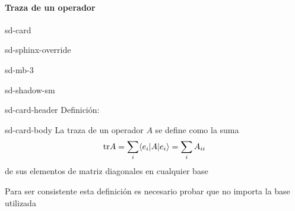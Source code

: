 \documentclass[letterpaper,10pt,english]{jupyterBook}
\newcommand{\bra}[1]{\langle #1|}
\newcommand{\ket}[1]{|#1\rangle}
\newcommand{\tr}{{\rm tr}}
\begin{document}
\paragraph{Traza de un operador}
\label{\detokenize{docs/Part_01_Formalismo/Chapter_01_02_Formalismo_matem_xe1tico/01_03_Operadores_myst:traza-de-un-operador}}
\begin{sphinxuseclass}{sd-card}
\begin{sphinxuseclass}{sd-sphinx-override}
\begin{sphinxuseclass}{sd-mb-3}
\begin{sphinxuseclass}{sd-shadow-sm}
\begin{sphinxuseclass}{sd-card-header}
\sphinxAtStartPar
Definición:

\end{sphinxuseclass}
\begin{sphinxuseclass}{sd-card-body}
\sphinxAtStartPar
La traza de un operador \(A\) se define como la suma
\begin{equation*}
\tr A = \sum_ i \bra{e_i} A\ket{e_i} =  \sum_{i} A_{ii} 
\end{equation*}
\sphinxAtStartPar
de sus elementos de matriz diagonales  en cualquier base 

\end{sphinxuseclass}
\end{sphinxuseclass}
\end{sphinxuseclass}
\end{sphinxuseclass}
\end{sphinxuseclass}
\sphinxAtStartPar
Para ser consistente esta definición es necesario probar que no importa la base utilizada
\end{document}
